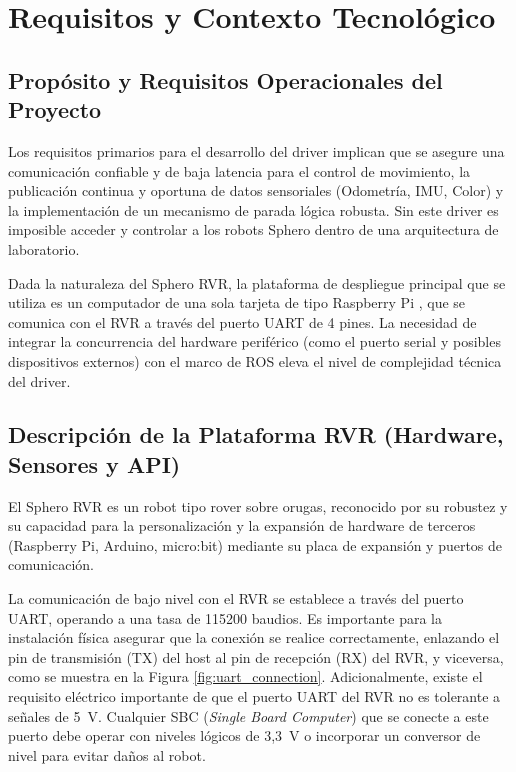\documentclass[11pt]{article}
\numberwithin{figure}{section}
\numberwithin{table}{section}
\begin{document}
\newpage


\section{Requisitos y Contexto Tecnológico}


\subsection{Propósito y Requisitos Operacionales del Proyecto}

Los requisitos primarios para el desarrollo del driver implican que se asegure una comunicación confiable y de baja latencia para el control de movimiento, la publicación continua y oportuna de datos sensoriales (Odometría, IMU, Color) y la implementación de un mecanismo de parada lógica robusta. Sin este driver es imposible acceder y controlar a los robots Sphero dentro de una arquitectura de laboratorio.

Dada la naturaleza del Sphero RVR, la plataforma de despliegue principal que se utiliza es un computador de una sola tarjeta de tipo Raspberry Pi \cite{RaspberryPi_Website}, que se comunica con el RVR a través del puerto UART de 4 pines. La necesidad de integrar la concurrencia del hardware periférico (como el puerto serial y posibles dispositivos externos) con el marco de ROS eleva el nivel de complejidad técnica del driver.


\subsection{Descripción de la Plataforma RVR (Hardware, Sensores y API)}

El Sphero RVR \cite{Sphero_RVR_Plus} es un robot tipo rover sobre orugas, reconocido por su robustez y su capacidad para la personalización y la expansión de hardware de terceros (Raspberry Pi, Arduino, micro:bit) mediante su placa de expansión y puertos de comunicación.

La comunicación de bajo nivel con el RVR se establece a través del puerto UART, operando a una tasa de 115200 baudios. Es importante para la instalación física asegurar que la conexión se realice correctamente, enlazando el pin de transmisión (TX) del host al pin de recepción (RX) del RVR, y viceversa, como se muestra en la Figura \ref{fig:uart_connection}. Adicionalmente, existe el requisito eléctrico importante de que el puerto UART del RVR no es tolerante a señales de 5~V. Cualquier SBC (\textit{Single Board Computer}) que se conecte a este puerto debe operar con niveles lógicos de 3,3~V o incorporar un conversor de nivel para evitar daños al robot.
\end{document}
